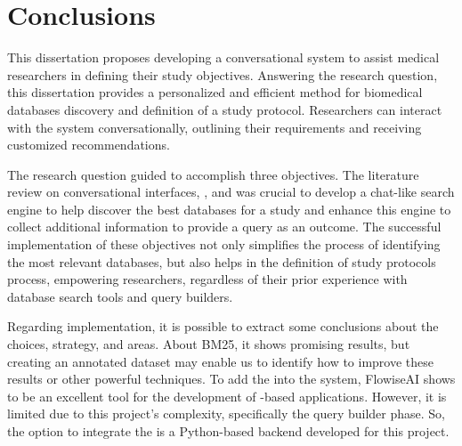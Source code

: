 \chapter{Conclusions}
\label{chapter:Conclusions}





This dissertation proposes developing a conversational system to assist medical researchers in defining their study objectives. Answering the research question, this dissertation provides a personalized and efficient method for biomedical databases discovery and definition of a study protocol. Researchers can interact with the system conversationally, outlining their requirements and receiving customized recommendations.

The research question guided to accomplish three objectives. The literature review on conversational interfaces, {\nlp}, and {\ir} was crucial to develop a chat-like search engine to help discover the best databases for a study and enhance this engine to collect additional information to provide a query as an outcome. The successful implementation of these objectives not only simplifies the process of identifying the most relevant databases, but also helps in the definition of study protocols process, empowering researchers, regardless of their prior experience with database search tools and query builders.

Regarding implementation, it is possible to extract some conclusions about the choices, strategy, and areas. About BM25, it shows promising results, but creating an annotated dataset may enable us to identify how to improve these results or other powerful {\ir} techniques. To add the {\llm} into the system, FlowiseAI shows to be an excellent tool for the development of {\llm}-based applications. However, it is limited due to this project's complexity, specifically the query builder phase. So, the option to integrate the {\llm} is a Python-based backend developed for this project.

